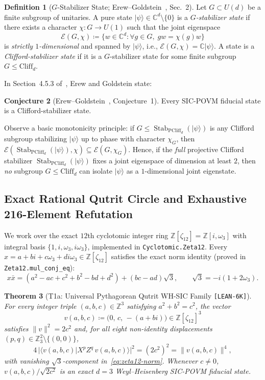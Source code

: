 \documentclass[11pt,letterpaper]{article}
\theoremstyle{plain}
\newtheorem{theorem}{Theorem}[section]
\theoremstyle{definition}
\newtheorem{definition}[theorem]{Definition}
\newtheorem{conjecture}[theorem]{Conjecture}
\theoremstyle{remark}
\newcommand{\Z}{\mathbb{Z}}
\newcommand{\C}{\mathbb{C}}
\newcommand{\Stab}{\operatorname{Stab}}
\newcommand{\PCliff}{\mathrm{PCliff}}
\newcommand{\Cliff}{\mathrm{Cliff}}
\newcommand{\ket}[1]{\lvert #1 \rangle}
\newcommand{\braket}[2]{\langle #1 \vert #2 \rangle}
\newcommand{\norm}[1]{\lVert #1 \rVert}
\newcommand{\leanref}[1]{\textnormal{\texttt{\footnotesize #1}}}
\newcommand{\tagbadge}[1]{\textnormal{\texttt{\small [#1]}}}
\begin{document}
\begin{definition}[$G$-Stabilizer State; Erew--Goldstein~\cite{ErewGoldstein2026}, Sec.~2]
\label{def:g-stab}
Let $G\subset U(d)$ be a finite subgroup of unitaries. A pure state $\ket{\psi}\in\C^d\setminus\{0\}$ is a \emph{$G$-stabilizer state} if there exists a character $\chi:G\to U(1)$ such that the joint eigenspace
\[
  \mathcal{E}(G,\chi) \coloneqq \bigl\{ w\in\C^d : \forall g\in G,\; g w = \chi(g) w \bigr\}
\]
is \emph{strictly $1$-dimensional} and spanned by $\ket{\psi}$, i.e., $\mathcal{E}(G,\chi)=\C\ket{\psi}$. A state is a \emph{Clifford-stabilizer state} if it is a $G$-stabilizer state for some finite subgroup $G\le \Cliff_d$.
\end{definition}

In Section~4.5.3 of~\cite{ErewGoldstein2026}, Erew and Goldstein state:
\begin{conjecture}[Erew--Goldstein~\cite{ErewGoldstein2026}, Conjecture~1]
Every SIC-POVM fiducial state is a Clifford-stabilizer state.
\end{conjecture}

Observe a basic monotonicity principle: if $G\le \Stab_{\PCliff_d}(\ket{\psi})$ is any Clifford subgroup stabilizing $\ket{\psi}$ up to phase with character $\chi_G$, then $\mathcal{E}(\Stab_{\PCliff_d}(\ket{\psi}),\chi)\subseteq \mathcal{E}(G,\chi_G)$. Hence, if the \emph{full} projective Clifford stabilizer $\Stab_{\PCliff_d}(\ket{\psi})$ fixes a joint eigenspace of dimension at least $2$, then \emph{no} subgroup $G\le \Cliff_d$ can isolate $\ket{\psi}$ as a $1$-dimensional joint eigenstate.

\subsection{Exact Rational Qutrit Circle and Exhaustive 216-Element Refutation}

We work over the exact $12$th cyclotomic integer ring $\Z[\zeta_{12}]=\Z[i,\omega_3]$ with integral basis $\{1,i,\omega_3,i\omega_3\}$, implemented in \leanref{Cyclotomic.Zeta12}. Every $x=a+bi+c\omega_3+di\omega_3\in\Z[\zeta_{12}]$ satisfies the exact norm identity (proved in \leanref{Zeta12.mul\_conj\_eq}):
\begin{equation}
\label{eq:zeta12-norm}
  x\bar{x} = (a^2 - ac + c^2 + b^2 - bd + d^2) + (bc - ad)\sqrt{3},
  \qquad \sqrt{3} = -i(1+2\omega_3).
\end{equation}

\begin{theorem}[{T1a: Universal Pythagorean Qutrit WH-SIC Family \tagbadge{LEAN-6K}}]
\label{thm:t1a}
For every integer triple $(a,b,c)\in\Z^3$ satisfying $a^2+b^2=c^2$, the vector
\[
  v(a,b,c) \coloneqq \bigl(0,\, c,\, -(a+bi)\bigr) \in \Z[\zeta_{12}]^3
\]
satisfies $\norm{v}^2=2c^2$ and, for all eight non-identity displacements $(p,q)\in\Z_3^2\setminus\{(0,0)\}$,
\[
  4\,\bigl|\braket{v(a,b,c)}{X^p Z^q\, v(a,b,c)}\bigr|^2 = (2c^2)^2 = \norm{v(a,b,c)}^4,
\]
with vanishing $\sqrt{3}$-component in~\eqref{eq:zeta12-norm}. Whenever $c\neq 0$, $v(a,b,c)/\sqrt{2c^2}$ is an exact $d=3$ Weyl--Heisenberg SIC-POVM fiducial state.
\end{theorem}
\end{document}

